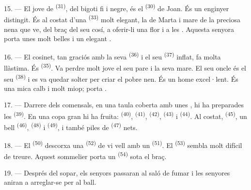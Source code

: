 15. --- El jove de  \textsuperscript{(31)}, del bigoti fi i negre, és el
 \textsuperscript{(30)} de Joan. És un enginyer distingit. És al costat d'una
 \textsuperscript{(33)} molt elegant, la
 de Marta i mare de la preciosa nena que ve, del braç del
seu cosí, a oferir-li una flor i a  les . Aquesta senyora
porta unes  molt belles i un elegant
.

16. --- El cosinet, tan graciós amb la seva  \textsuperscript{(36)} i el seu
 \textsuperscript{(37)} inflat, fa molta llàstima. És
 \textsuperscript{(35)}. Va perdre molt jove el seu pare i la seva
mare. El seu oncle és el seu  \textsuperscript{(38)} i es va quedar solter per
criar el pobre nen. És un home excel·lent. És una mica calb i molt miop; porta
.

\VUsaut{2.4mm}
\VUsaut{3.0mm}

17. --- Darrere dels comensals, en una taula coberta amb unes , hi ha
preparades les  \textsuperscript{(39)}. En una copa gran hi ha fruita:
 \textsuperscript{(40)},  \textsuperscript{(41)},
 \textsuperscript{(42)},
 \textsuperscript{(43)} i 
\textsuperscript{(44)}. Al costat,  \textsuperscript{(45)}, un bell
 \textsuperscript{(46)},  \textsuperscript{(48)} i
 \textsuperscript{(49)}, i també piles de
 \textsuperscript{(47)} nets.

18. --- El  \textsuperscript{(50)} descorxa una 
\textsuperscript{(52)} de vi vell amb un  \textsuperscript{(51)}. El
 \textsuperscript{(53)} sembla molt difícil de treure. Aquest sommelier porta un
 \textsuperscript{(54)} sota el braç.

19. --- Després del sopar, els senyors passaran al saló de fumar i les senyores aniran a
arreglar-se per al ball.

\VUsaut{5.0mm}
\VUsaut{1.6mm}
\VUsaut{2.6mm}

\VUsaut{3.0mm}


